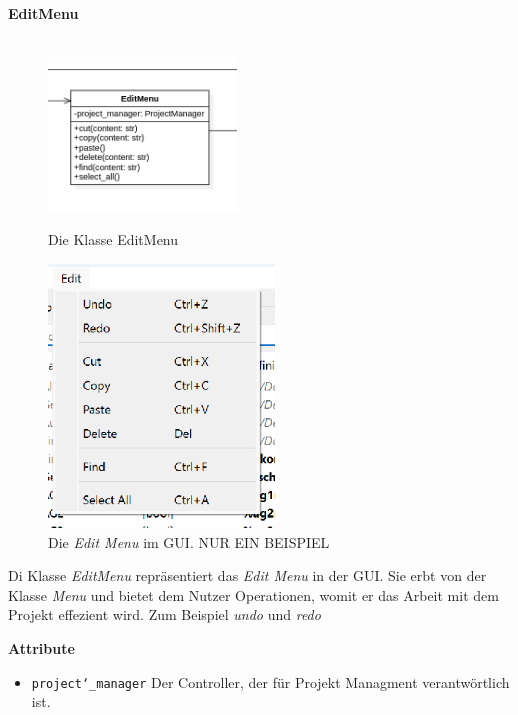 \documentclass{article}
\begin{document}
\newpage
\textbf{\large{EditMenu}}\\\\
\begin{figure}[H]%
    \centering
    \begin{minipage}[b]{0.4\textwidth}
        \includegraphics[width=5cm]{entwurf/Entwurf_dokument/img/Alissa/EditMenu.png}
        \caption{Die Klasse EditMenu}
    \end{minipage}
    \hfill
    \begin{minipage}[b]{0.4\textwidth}
        \includegraphics[width=6cm]{entwurf/Entwurf_dokument/img/Alissa/FileMenuGUI.png} %
    \caption{Die \textit{Edit Menu} im GUI. NUR EIN BEISPIEL}
    \end{minipage}
\end{figure}
Di Klasse \textit{EditMenu} repräsentiert das \textit{Edit Menu} in der GUI. Sie erbt von der Klasse \textit{Menu} und bietet dem Nutzer Operationen, womit er das Arbeit mit dem Projekt effezient wird. Zum Beispiel \textit{undo} und \textit{redo}
\newline \newline

\textbf{{Attribute}}
\begin{itemize}
\item \texttt{project\char`_manager} \newline Der Controller, der für Projekt Managment verantwörtlich ist.
\end{itemize}
\end{document}
